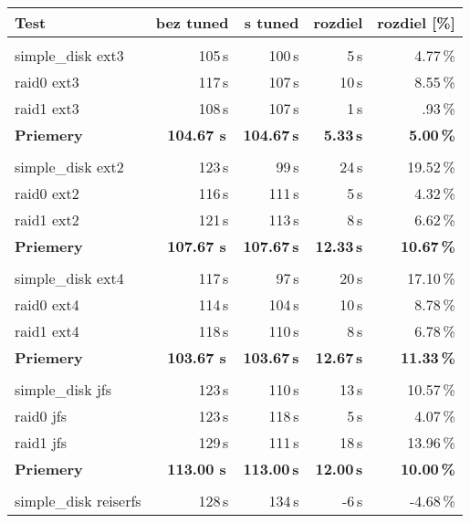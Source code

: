 {{\renewcommand{\arraystretch}{1.1}
\begin{table}[H]
\begin{center}
\begin{tabular}{|l|r r r r|}
    \hline
    \textbf{Test} & \textbf{bez tuned} & \textbf{s tuned} & \textbf{rozdiel} & \textbf{rozdiel [\%]} \\
    \hline & \\[-1em]\hline
    simple\_disk ext3 & 105\,s & 100\,s & 5\,s & 4.77\,\% \\
    raid0 ext3 & 117\,s & 107\,s & 10\,s & 8.55\,\% \\
    raid1 ext3 & 108\,s & 107\,s & 1\,s & .93\,\% \\
    \hline
    \textbf{Priemery} & \textbf{104.67 s}\,& \textbf{104.67\,s} & \textbf{5.33\,s} & \textbf{5.00\,\%} \\
    \hline & \\[-1em]\hline
    simple\_disk ext2 & 123\,s & 99\,s & 24\,s & 19.52\,\% \\
    raid0 ext2 & 116\,s & 111\,s & 5\,s & 4.32\,\% \\
    raid1 ext2 & 121\,s & 113\,s & 8\,s & 6.62\,\% \\
    \hline
    \textbf{Priemery} & \textbf{107.67 s}\,& \textbf{107.67\,s} & \textbf{12.33\,s} & \textbf{10.67\,\%} \\
    \hline & \\[-1em]\hline
    simple\_disk ext4 & 117\,s & 97\,s & 20\,s & 17.10\,\% \\
    raid0 ext4 & 114\,s & 104\,s & 10\,s & 8.78\,\% \\
    raid1 ext4 & 118\,s & 110\,s & 8\,s & 6.78\,\% \\
    \hline
    \textbf{Priemery} & \textbf{103.67 s}\,& \textbf{103.67\,s} & \textbf{12.67\,s} & \textbf{11.33\,\%} \\
    \hline & \\[-1em]\hline
    simple\_disk jfs & 123\,s & 110\,s & 13\,s & 10.57\,\% \\
    raid0 jfs & 123\,s & 118\,s & 5\,s & 4.07\,\% \\
    raid1 jfs & 129\,s & 111\,s & 18\,s & 13.96\,\% \\
    \hline
    \textbf{Priemery} & \textbf{113.00 s}\,& \textbf{113.00\,s} & \textbf{12.00\,s} & \textbf{10.00\,\%} \\
    \hline & \\[-1em]\hline
    simple\_disk reiserfs & 128\,s & 134\,s & -6\,s & -4.68\,\% \\

\end{tabular}
\end{center}
\end{table}}}
